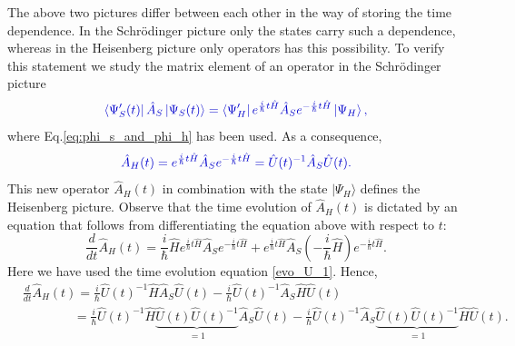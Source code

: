 \documentclass[12pt, titlepage]{article}
\begin{document}
The above two pictures differ between each other in the way of storing the time dependence. In the Schrödinger picture only the states carry such a dependence, whereas in the Heisenberg picture only operators has this possibility. To verify this statement we study the matrix element of an operator in the Schrödinger picture
\begin{equation}\label{eq:matrix_ele_time_dep}
\textcolor[RGB]{0,0,204}{
\bra{\Psi^{\prime}_{S}(t)}\hat{A}_{S}\ket{\Psi_{S} (t)}
=\bra{\Psi^{\prime}_{H}}e^{\frac{i}{\hbar}t\hat{H}}\hat{A}_{S}
e^{-\frac{i}{\hbar}t\hat{H}}\ket{\Psi_{H} },
}
\end{equation}
where Eq.\enskip\eqref{eq:phi_s_and_phi_h} has been used. As a consequence, 
\begin{equation}\label{eq:S-H-Operator_Trafo}
\textcolor[RGB]{0,0,204}{
\hat{A}_{H}(t)=e^{\frac{i}{\hbar}t\hat{H}}\hat{A}_{S}
e^{-\frac{i}{\hbar}t\hat{H}}=\hat{U}(t)^{-1}\hat{A}_{S}\hat{U}(t).
}
\end{equation}
This new operator $ \hat{A}_{H}(t) $ in combination with the state $ \vert\Psi_{H} \rangle$ defines the Heisenberg picture. Observe that the time evolution of $ \hat{A}_{H}(t) $  is dictated by an equation that follows from differentiating the equation above with respect to $ t $:
\begin{equation}
\frac{d}{dt}\hat{A}_{H}(t)
=\frac{i}{\hbar}\hat{H}
e^{\frac{i}{\hbar}t \hat{H}}
\hat{A}_{S}
e^{-\frac{i}{\hbar}t \hat{H}}
+e^{\frac{i}{\hbar}t \hat{H}}
\hat{A}_{S}
\left( -\frac{i}{\hbar}\hat{H}\right) 
e^{-\frac{i}{\hbar}t \hat{H}}.
\end{equation}
Here we have used the  time evolution equation \eqref{evo_U_1}. Hence,
\begin{equation}\label{time_evo_seven}
\begin{split}
&\frac{d}{dt}\hat{A}_{H}(t)
	=\frac{i}{\hbar}
	\hat{U}(t)^{-1}\hat{H}\hat{A}_{S}\hat{U}(t)
	-
	\frac{i}{\hbar}
	\hat{U}(t)^{-1}\hat{A}_{S}\hat{H}\hat{U}(t)
	\\
&\qquad\qquad=\frac{i}{\hbar}
	\hat{U}(t)^{-1}\hat{H}\underbrace{\hat{U}(t)\hat{U}(t)^{-1}}_{=1}\hat{A}_{S}\hat{U}(t)
	-
	\frac{i}{\hbar}
	\hat{U}(t)^{-1}\hat{A}_{S}\underbrace{\hat{U}(t)\hat{U}(t)^{-1}}_{=1}\hat{H}\hat{U}(t).
\end{split}
\end{equation}
\end{document}

